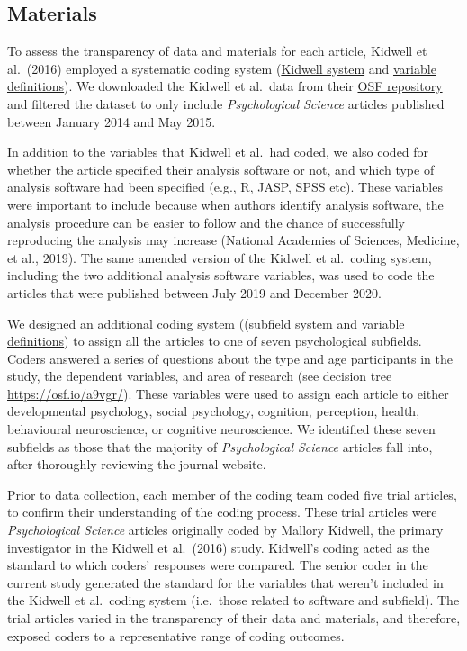 \documentclass[
  english,
  man,floatsintext]{apa6}
\begin{document}
\hypertarget{materials}{%
\subsection{Materials}\label{materials}}

To assess the transparency of data and materials for each article, Kidwell et al.~(2016) employed a systematic coding system (\href{https://osf.io/j4x23/?view_only=b97cd4c4f6d645bc9e8870d97b6f3da4}{Kidwell system} and \href{https://osf.io/n7grj/?view_only=b97cd4c4f6d645bc9e8870d97b6f3da4}{variable definitions}). We downloaded the Kidwell et al.~data from their \href{https://osf.io/rfgdw/}{OSF repository} and filtered the dataset to only include \emph{Psychological Science} articles published between January 2014 and May 2015.

In addition to the variables that Kidwell et al.~had coded, we also coded for whether the article specified their analysis software or not, and which type of analysis software had been specified (e.g., R, JASP, SPSS etc). These variables were important to include because when authors identify analysis software, the analysis procedure can be easier to follow and the chance of successfully reproducing the analysis may increase (National Academies of Sciences, Medicine, et al., 2019).
The same amended version of the Kidwell et al.~coding system, including the two additional analysis software variables, was used to code the articles that were published between July 2019 and December 2020.

We designed an additional coding system ((\href{https://osf.io/a9vgr/?view_only=b97cd4c4f6d645bc9e8870d97b6f3da4}{subfield system} and \href{https://osf.io/md5eu/?view_only=b97cd4c4f6d645bc9e8870d97b6f3da4}{variable definitions}) to assign all the articles to one of seven psychological subfields. Coders answered a series of questions about the type and age participants in the study, the dependent variables, and area of research (see decision tree \url{https://osf.io/a9vgr/}). These variables were used to assign each article to either developmental psychology, social psychology, cognition, perception, health, behavioural neuroscience, or cognitive neuroscience. We identified these seven subfields as those that the majority of \emph{Psychological Science} articles fall into, after thoroughly reviewing the journal website.

Prior to data collection, each member of the coding team coded five trial articles, to confirm their understanding of the coding process. These trial articles were \emph{Psychological Science} articles originally coded by Mallory Kidwell, the primary investigator in the Kidwell et al.~(2016) study. Kidwell's coding acted as the standard to which coders' responses were compared. The senior coder in the current study generated the standard for the variables that weren't included in the Kidwell et al.~coding system (i.e.~those related to software and subfield). The trial articles varied in the transparency of their data and materials, and therefore, exposed coders to a representative range of coding outcomes.
\end{document}
